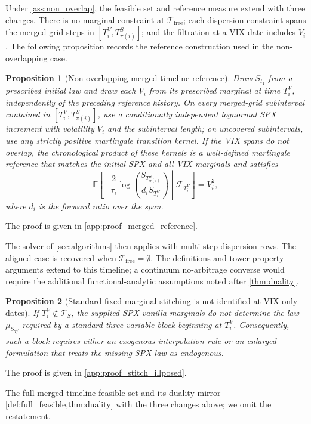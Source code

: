 \documentclass{article}
\newtheorem{proposition}{Proposition}[section]
\newcommand{\cF}{\mathcal{F}}
\newcommand{\Embb}{\mathbb{E}}
\begin{document}
Under \cref{ass:non_overlap}, the feasible set and reference measure extend with three changes.
There is no marginal constraint at $\mathcal{T}_{\mathrm{free}}$; each dispersion constraint spans the merged-grid steps in $[T_i^V,T_{\pi(i)}^S]$; and the filtration at a VIX date includes $V_i$.
The following proposition records the reference construction used in the non-overlapping case.

\begin{proposition}[Non-overlapping merged-timeline reference]\label{prop:merged_reference}
Draw $S_{t_1}$ from a prescribed initial law and draw each $V_i$ from its prescribed marginal at time $T_i^V$, independently of the preceding reference history.
On every merged-grid subinterval contained in $[T_i^V,T_{\pi(i)}^S]$, use a conditionally independent lognormal SPX increment with volatility $V_i$ and the subinterval length; on uncovered subintervals, use any strictly positive martingale transition kernel.
If the VIX spans do not overlap, the chronological product of these kernels is a well-defined martingale reference that matches the initial SPX and all VIX marginals and satisfies
\[
\Embb\!\left[-\frac{2}{\tau_i}\log\!\left(
\frac{S_{T_{\pi(i)}^S}}{d_iS_{T_i^V}}
\right)\middle|\cF_{T_i^V}\right]=V_i^2,
\]
where $d_i$ is the forward ratio over the span.
\end{proposition}
The proof is given in \cref{app:proof_merged_reference}.

The solver of \cref{sec:algorithms} then applies with multi-step dispersion rows.
The aligned case is recovered when $\mathcal{T}_{\mathrm{free}} = \emptyset$.
The definitions and tower-property arguments extend to this timeline; a continuum no-arbitrage converse would require the additional functional-analytic assumptions noted after \cref{thm:duality}.

\begin{proposition}[Standard fixed-marginal stitching is not identified at VIX-only dates]\label{prop:stitch_illposed}
If $T_i^V \notin \mathcal{T}_S$, the supplied SPX vanilla marginals do not determine the law $\mu_{S_{T_i^V}}$ required by a standard three-variable block beginning at $T_i^V$.
Consequently, such a block requires either an exogenous interpolation rule or an enlarged formulation that treats the missing SPX law as endogenous.
\end{proposition}
The proof is given in \cref{app:proof_stitch_illposed}.

The full merged-timeline feasible set and its duality mirror \cref{def:full_feasible,thm:duality} with the three changes above; we omit the restatement.
\end{document}
